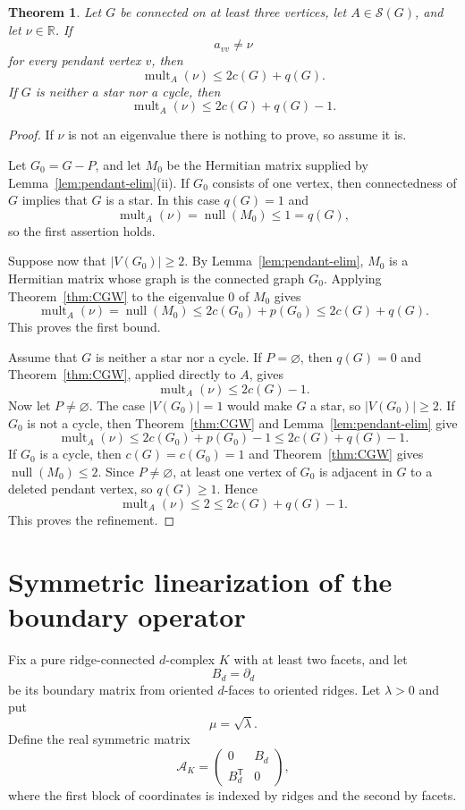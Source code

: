 \documentclass[12pt]{article}
\newtheorem{theorem}{Theorem}
\theoremstyle{remark}
\newcommand{\R}{\mathbb{R}}
\newcommand{\nullity}{\operatorname{null}}
\newcommand{\mult}{\operatorname{mult}}
\begin{document}
\begin{theorem}\label{thm:Hermitian-q}
Let $G$ be connected on at least three vertices, let $A\in\mathcal S(G)$, and let $\nu\in\R$.  If
\[
a_{vv}\ne\nu
\]
for every pendant vertex $v$, then
\[
\mult_A(\nu)\le 2c(G)+q(G).
\]
If $G$ is neither a star nor a cycle, then
\[
\mult_A(\nu)\le 2c(G)+q(G)-1.
\]
\end{theorem}

\begin{proof}
If $\nu$ is not an eigenvalue there is nothing to prove, so assume it is.

Let $G_0=G-P$, and let $M_0$ be the Hermitian matrix supplied by Lemma~\ref{lem:pendant-elim}(ii).  If $G_0$ consists of one vertex, then connectedness of $G$ implies that $G$ is a star.  In this case $q(G)=1$ and
\[
\mult_A(\nu)=\nullity(M_0)\le1=q(G),
\]
so the first assertion holds.

Suppose now that $|V(G_0)|\ge2$.  By Lemma~\ref{lem:pendant-elim}, $M_0$ is a Hermitian matrix whose graph is the connected graph $G_0$.  Applying Theorem~\ref{thm:CGW} to the eigenvalue $0$ of $M_0$ gives
\[
\mult_A(\nu)=\nullity(M_0)\le 2c(G_0)+p(G_0)\le 2c(G)+q(G).
\]
This proves the first bound.

Assume that $G$ is neither a star nor a cycle.  If $P=\varnothing$, then $q(G)=0$ and Theorem~\ref{thm:CGW}, applied directly to $A$, gives
\[
\mult_A(\nu)\le2c(G)-1.
\]
Now let $P\ne\varnothing$.  The case $|V(G_0)|=1$ would make $G$ a star, so $|V(G_0)|\ge2$.  If $G_0$ is not a cycle, then Theorem~\ref{thm:CGW} and Lemma~\ref{lem:pendant-elim} give
\[
\mult_A(\nu)
\le2c(G_0)+p(G_0)-1
\le2c(G)+q(G)-1.
\]
If $G_0$ is a cycle, then $c(G)=c(G_0)=1$ and Theorem~\ref{thm:CGW} gives $\nullity(M_0)\le2$.  Since $P\ne\varnothing$, at least one vertex of $G_0$ is adjacent in $G$ to a deleted pendant vertex, so $q(G)\ge1$.  Hence
\[
\mult_A(\nu)\le2\le2c(G)+q(G)-1.
\]
This proves the refinement.
\end{proof}

\section{Symmetric linearization of the boundary operator}

Fix a pure ridge-connected $d$-complex $K$ with at least two facets, and let
\[
B_d=\partial_d
\]
be its boundary matrix from oriented $d$-faces to oriented ridges.  Let $\lambda>0$ and put
\[
\mu=\sqrt\lambda.
\]
Define the real symmetric matrix
\[
\mathcal A_K=
\begin{pmatrix}
0&B_d\\
B_d^{\mathsf T}&0
\end{pmatrix},
\]
where the first block of coordinates is indexed by ridges and the second by facets.
\end{document}
